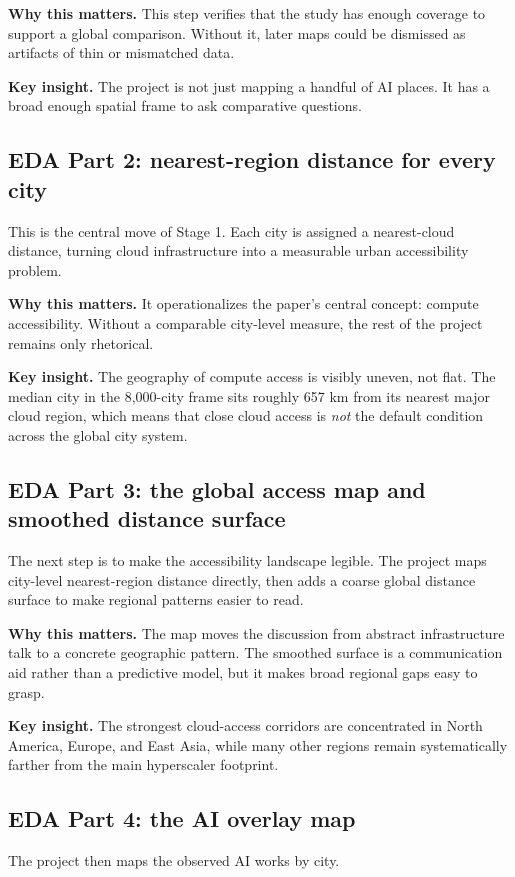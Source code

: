\documentclass[11pt]{article}
\begin{document}
\textbf{Why this matters.} This step verifies that the study has enough coverage to support a global comparison. Without it, later maps could be dismissed as artifacts of thin or mismatched data.

\textbf{Key insight.} The project is not just mapping a handful of AI places. It has a broad enough spatial frame to ask comparative questions.

\subsection{EDA Part 2: nearest-region distance for every city}
This is the central move of Stage 1. Each city is assigned a nearest-cloud distance, turning cloud infrastructure into a measurable urban accessibility problem.

\textbf{Why this matters.} It operationalizes the paper's central concept: compute accessibility. Without a comparable city-level measure, the rest of the project remains only rhetorical.

\textbf{Key insight.} The geography of compute access is visibly uneven, not flat. The median city in the 8{,}000-city frame sits roughly 657 km from its nearest major cloud region, which means that close cloud access is \emph{not} the default condition across the global city system.

\subsection{EDA Part 3: the global access map and smoothed distance surface}
The next step is to make the accessibility landscape legible. The project maps city-level nearest-region distance directly, then adds a coarse global distance surface to make regional patterns easier to read.

\textbf{Why this matters.} The map moves the discussion from abstract infrastructure talk to a concrete geographic pattern. The smoothed surface is a communication aid rather than a predictive model, but it makes broad regional gaps easy to grasp.

\textbf{Key insight.} The strongest cloud-access corridors are concentrated in North America, Europe, and East Asia, while many other regions remain systematically farther from the main hyperscaler footprint.

\subsection{EDA Part 4: the AI overlay map}
The project then maps the observed AI works by city.
\end{document}

